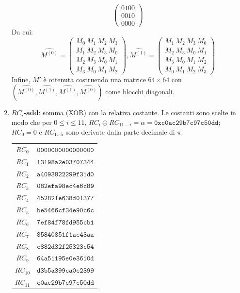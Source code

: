 \documentclass[target=bach,aauheader=,style=]{thud}
\begin{document}
\begin{enumerate}
\[\begin{pmatrix}
					0100\\
					0010\\
					0000
				\end{pmatrix}
				\]
				Da cui:
				\[ \hat{M^{(0)}} = 
				\begin{pmatrix}
					M_0\ M_1\ M_2\ M_3\\
					M_1\ M_2\ M_3\ M_0\\
					M_2\ M_3\ M_0\ M_1\\
					M_3\ M_0\ M_1\ M_2
				\end{pmatrix},
				\hat{M^{(1)}} = 
				\begin{pmatrix}
					M_1\ M_2\ M_3\ M_0\\
					M_2\ M_3\ M_0\ M_1\\
					M_3\ M_0\ M_1\ M_2\\
					M_0\ M_1\ M_2\ M_3
				\end{pmatrix}
				\]
				Infine, $M'$ è ottenuta costruendo una matrice $64 \times 64$ con $(\hat{M^{(0)}} , \hat{M^{(1)}}, \hat{M^{(1)}}, \hat{M^{(0)}})$ come blocchi diagonali.
				\item \textbf{$RC_i$-add}: somma (XOR) con la relativa costante. Le costanti sono scelte in modo che per $0 \le i \le 11$, $RC_i \oplus RC_{11-i} = \alpha = \mathtt{0xc0ac29b7c97c50dd}$; $RC_0 = 0$ e $RC_{1...5}$ sono derivate dalla parte decimale di $\pi$.
				\begin{center}
					\begin{tabular}{|c||c|}
						\hline
						$RC_0$ & $\mathtt{0000000000000000}$ \\
						$RC_1$ & $\mathtt{13198a2e03707344}$ \\
						$RC_2$ & $\mathtt{a4093822299f31d0}$ \\
						$RC_3$ & $\mathtt{082efa98ec4e6c89}$ \\
						$RC_4$ & $\mathtt{452821e638d01377}$ \\
						$RC_5$ & $\mathtt{be5466cf34e90c6c}$ \\
						$RC_6$ & $\mathtt{7ef84f78fd955cb1}$ \\
						$RC_7$ & $\mathtt{85840851f1ac43aa}$ \\
						$RC_8$ & $\mathtt{c882d32f25323c54}$ \\
						$RC_9$ & $\mathtt{64a51195e0e3610d}$ \\
						$RC_{10}$ & $\mathtt{d3b5a399ca0c2399}$ \\
						$RC_{11}$ & $\mathtt{c0ac29b7c97c50dd}$ \\
						\hline
					\end{tabular}
				\end{center}
			\end{enumerate}
\end{document}
